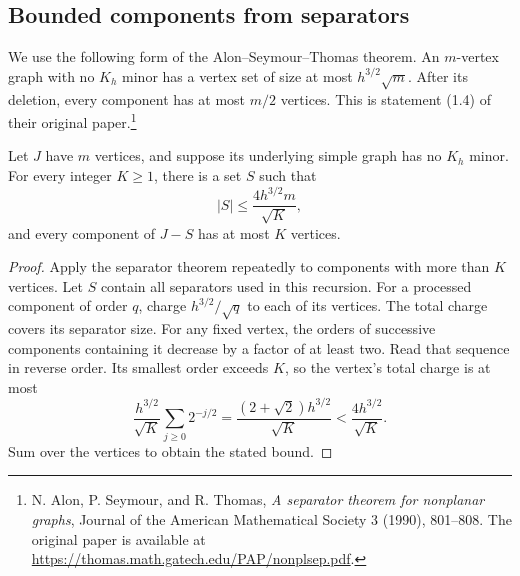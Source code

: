 \subsection{Bounded components from separators}

We use the following form of the Alon--Seymour--Thomas theorem.
An $m$-vertex graph with no $K_h$ minor has a vertex set of size at most $h^{3/2}\sqrt m$.
After its deletion, every component has at most $m/2$ vertices.
This is statement (1.4) of their original paper.\footnote{N. Alon, P. Seymour, and R. Thomas,
\emph{A separator theorem for nonplanar graphs}, Journal of the American Mathematical Society 3 (1990), 801--808.
The original paper is available at \url{https://thomas.math.gatech.edu/PAP/nonplsep.pdf}.}

\begin{lemma}\label{lem:path-small-components}
Let $J$ have $m$ vertices, and suppose its underlying simple graph has no $K_h$ minor.
For every integer $K\ge1$, there is a set $S$ such that
\[
 |S|\le\frac{4h^{3/2}m}{\sqrt K},
\]
and every component of $J-S$ has at most $K$ vertices.
\end{lemma}

\begin{proof}
Apply the separator theorem repeatedly to components with more than $K$ vertices.
Let $S$ contain all separators used in this recursion.
For a processed component of order $q$, charge $h^{3/2}/\sqrt q$ to each of its vertices.
The total charge covers its separator size.
For any fixed vertex, the orders of successive components containing it decrease by a factor of at least two.
Read that sequence in reverse order.
Its smallest order exceeds $K$, so the vertex's total charge is at most
\[
 \frac{h^{3/2}}{\sqrt K}\sum_{j\ge0}2^{-j/2}
 =\frac{(2+\sqrt2)h^{3/2}}{\sqrt K}
 <\frac{4h^{3/2}}{\sqrt K}.
\]
Sum over the vertices to obtain the stated bound.
\end{proof}

